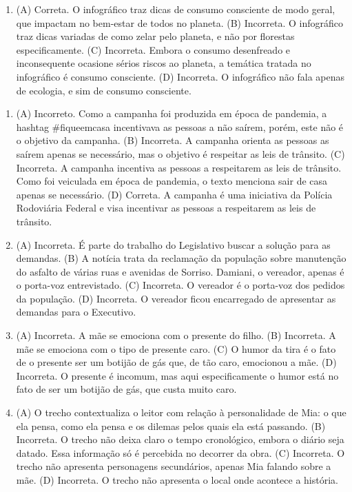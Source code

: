 \begin{enumerate}
\item (A) Correta. O infográfico traz dicas de consumo consciente de modo
geral, que impactam no bem-estar de todos no planeta.
(B) Incorreta. O infográfico traz dicas variadas de como zelar pelo
planeta, e não por florestas especificamente.
(C) Incorreta. Embora o consumo desenfreado e inconsequente ocasione
sérios riscos ao planeta, a temática tratada no infográfico é consumo
consciente.
(D) Incorreta. O infográfico não fala apenas de ecologia, e sim de
consumo consciente.
\end{enumerate}


\begin{enumerate}
\item (A) Incorreto. Como a campanha foi produzida em época de pandemia, a
hashtag \#fiqueemcasa incentivava as pessoas a não saírem, porém, este
não é o objetivo da campanha.
(B) Incorreta. A campanha orienta as pessoas as saírem apenas se
necessário, mas o objetivo é respeitar as leis de trânsito.
(C) Incorreta. A campanha incentiva as pessoas a respeitarem as leis de
trânsito. Como foi veiculada em época de pandemia, o texto menciona sair
de casa apenas se necessário.
(D) Correta. A campanha é uma iniciativa da Polícia Rodoviária Federal e
visa incentivar as pessoas a respeitarem as leis de trânsito.

\item (A) Incorreta. É parte do trabalho do Legislativo buscar a solução para
as demandas.
(B) A notícia trata da reclamação da população sobre manutenção do
asfalto de várias ruas e avenidas de Sorriso. Damiani, o vereador,
apenas é o porta-voz entrevistado.
(C) Incorreta. O vereador é o porta-voz dos pedidos da população.
(D) Incorreta. O vereador ficou encarregado de apresentar as demandas
para o Executivo.

\item (A) Incorreta. A mãe se emociona com o presente do filho.
(B) Incorreta. A mãe se emociona com o tipo de presente caro.
(C) O humor da tira é o fato de o presente ser um botijão de gás que, de
tão caro, emocionou a mãe.
(D) Incorreta. O presente é incomum, mas aqui especificamente o humor
está no fato de ser um botijão de gás, que custa muito caro.

\item (A) O trecho contextualiza o leitor com relação à personalidade de Mia: o
que ela pensa, como ela pensa e os dilemas pelos quais ela está
passando.
(B) Incorreta. O trecho não deixa claro o tempo cronológico, embora o
diário seja datado. Essa informação só é percebida no decorrer da obra.
(C) Incorreta. O trecho não apresenta personagens secundários, apenas Mia
falando sobre a mãe.
(D) Incorreta. O trecho não apresenta o local onde acontece a história.


\end{enumerate}
